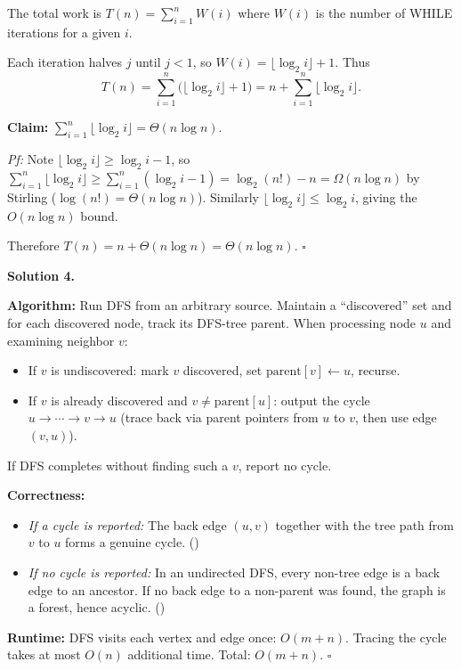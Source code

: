 \documentclass[10pt]{article}
\newcounter{prob}
\begin{document}
The total work is $T(n) = \sum_{i=1}^{n} W(i)$ where $W(i)$ is the number of WHILE iterations for a given $i$.

Each iteration halves $j$ until $j < 1$, so $W(i) = \lfloor \log_2 i \rfloor + 1$. Thus
$$T(n) = \sum_{i=1}^{n} \bigl(\lfloor\log_2 i\rfloor + 1\bigr) = n + \sum_{i=1}^{n} \lfloor\log_2 i\rfloor.$$

\textbf{Claim:} $\sum_{i=1}^{n}\lfloor\log_2 i\rfloor = \Theta(n\log n)$.

\textit{Pf:} Note $\lfloor\log_2 i\rfloor \ge \log_2 i - 1$, so $\sum_{i=1}^{n}\lfloor\log_2 i\rfloor \ge \sum_{i=1}^{n}(\log_2 i - 1) = \log_2(n!) - n = \Omega(n\log n)$ by Stirling ($\log(n!) = \Theta(n\log n)$). Similarly $\lfloor\log_2 i\rfloor \le \log_2 i$, giving the $O(n\log n)$ bound.

Therefore $T(n) = n + \Theta(n\log n) = \Theta(n\log n)$. $\square$

\bigskip

\noindent\textbf{Solution 4.}\par\smallskip

\textbf{Algorithm:} Run DFS from an arbitrary source. Maintain a ``discovered'' set and for each discovered node, track its DFS-tree parent. When processing node $u$ and examining neighbor $v$:
\begin{itemize}
  \item If $v$ is undiscovered: mark $v$ discovered, set $\mathrm{parent}[v] \leftarrow u$, recurse.
  \item If $v$ is already discovered and $v \ne \mathrm{parent}[u]$: output the cycle $u \to \cdots \to v \to u$ (trace back via parent pointers from $u$ to $v$, then use edge $(v,u)$).
\end{itemize}
If DFS completes without finding such a $v$, report no cycle.

\textbf{Correctness:}
\begin{itemize}
  \item \textit{If a cycle is reported:} The back edge $(u,v)$ together with the tree path from $v$ to $u$ forms a genuine cycle. (\checkmark)
  \item \textit{If no cycle is reported:} In an undirected DFS, every non-tree edge is a back edge to an ancestor. If no back edge to a non-parent was found, the graph is a forest, hence acyclic. (\checkmark)
\end{itemize}

\textbf{Runtime:} DFS visits each vertex and edge once: $O(m+n)$. Tracing the cycle takes at most $O(n)$ additional time. Total: $O(m+n)$. $\square$
\end{document}
